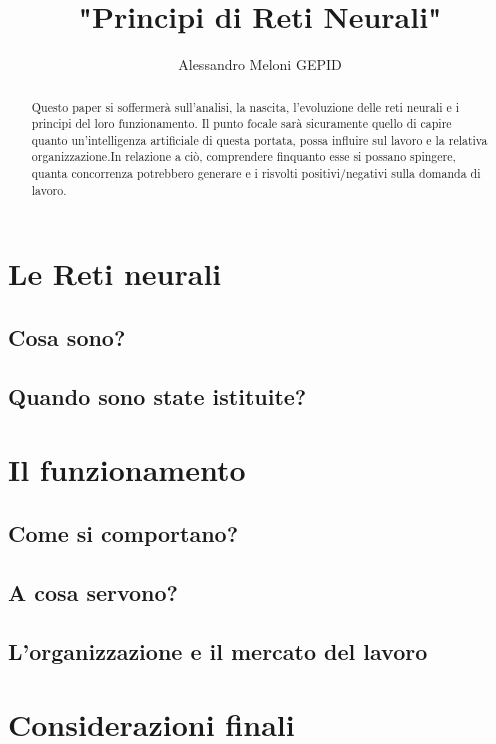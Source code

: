 \documentclass{article}
\title{\textbf{"Principi di Reti Neurali"}}
\author{Alessandro Meloni GEPID}
\date{}
\begin{document}
\maketitle
\begin{abstract}
\begin{justify}
    Questo paper si soffermerà sull'analisi, la nascita, l'evoluzione delle reti neurali e i principi del loro funzionamento. Il punto focale sarà sicuramente quello di capire quanto un'intelligenza artificiale di questa portata, possa influire sul lavoro e la relativa organizzazione.In relazione a ciò, comprendere finquanto esse si possano spingere, quanta concorrenza potrebbero generare e i risvolti positivi/negativi sulla domanda di lavoro.
\end{justify}
\end{abstract}

\centering \tableofcontents
\centering \newpage
\section{Le Reti neurali}

\flushleft \subsection{Cosa sono?}

\flushleft\subsection{Quando sono state istituite?}

\centering \newpage
\section{Il funzionamento}

\flushleft \subsection{Come si comportano?}

\flushleft \subsection{A cosa servono?}

\flushleft \subsection{L'organizzazione e il mercato del lavoro}

\centering \newpage
\section{Considerazioni finali}
\end{document}

